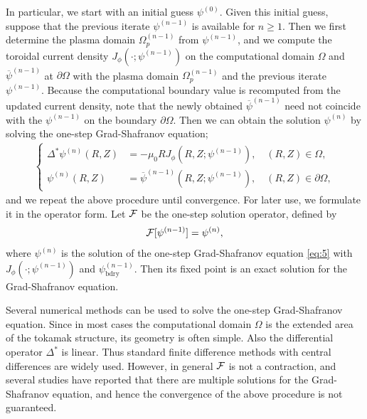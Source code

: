 In particular, we start with an initial guess $\psi^{(0)}$.
Given this initial guess, suppose that the previous iterate $\psi^{(n-1)}$
is available for $n \geq 1$.
Then we first determine the plasma domain $\Omega_p^{(n-1)}$ from $\psi^{(n-1)}$, 
and we compute the toroidal current density $J_\phi(\cdot ; \psi^{(n-1)})$ 
on the computational domain $\Omega$ and $\overline{\psi}^{(n-1)}$ at $\partial \Omega$ 
with the plasma domain $\Omega_p^{(n-1)}$ and the previous iterate $\psi^{(n-1)}$.
Because the computational boundary value is recomputed from the updated
current density, note that the newly obtained 
$\overline{\psi}^{(n-1)}$ need not coincide with the $\psi^{(n-1)}$ on the boundary $\partial \Omega$. 
Then we can obtain the solution $\psi^{(n)}$ by solving the one-step 
Grad-Shafranov equation;
\begin{align}\label{eq:5}
  \left\{
  \begin{aligned}
    \Delta^* \psi^{(n)}(R, Z) &= -\mu_0 R J_\phi(R, Z; \psi^{(n-1)}), \quad (R, Z) \in \Omega, \\
    \psi^{(n)}(R, Z) &= \overline{\psi}^{(n-1)}(R, Z; \psi^{(n-1)}), \quad (R, Z) \in \partial \Omega,
  \end{aligned}
  \right.
\end{align}
and we repeat the above procedure until convergence. 
For later use, we formulate it in the operator form. 
Let $\cal{F}$ be the one-step solution operator, defined by
\begin{align}\label{eq:defF}
  \cal{F}[\psi^{(n-1)}] = \psi^{(n)},
\end{align} 
where $\psi^{(n)}$ is the solution of the one-step Grad-Shafranov equation \eqref{eq:5} with 
$J_\phi(\cdot ; \psi^{(n-1)})$ and $\psi_{\text{bdry}}^{(n-1)}$.
Then its fixed point is an exact solution for the Grad-Shafranov equation.

Several numerical methods can be used to solve the one-step Grad-Shafranov equation.
Since in most cases the computational domain $\Omega$ is the extended area of the 
tokamak structure, its geometry is often simple.
Also the differential operator $\Delta^*$ is linear.
Thus standard finite difference methods with central differences are widely used.
However, in general $\cal{F}$ is not a contraction, and several studies 
\cite{multisolns2,multsolns} have reported that there are multiple solutions 
for the Grad-Shafranov equation, and hence the convergence of the above procedure is not guaranteed.

